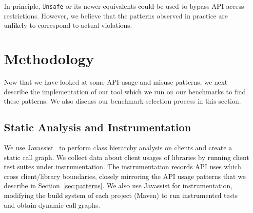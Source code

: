 In principle, \texttt{Unsafe} or its newer equivalents could be used to bypass API access restrictions. However, we believe that the patterns observed in practice are unlikely to correspond to actual violations.










\section{Methodology}
\label{sec:methodology}

Now that we have looked at some API usage and misuse patterns, we next describe the implementation of our tool which we run on our benchmarks to find these patterns.
We also discuss our benchmark selection process in this section.

\subsection{Static Analysis and Instrumentation}
\label{sec:analyses}

We use Javassist~\cite{chiba00:_load_struc_reflec_java} to perform class hierarchy analysis on clients
and create a static call graph. We collect data about client usages of libraries by running client
test suites under instrumentation. The instrumentation records API
uses which cross client/library boundaries, closely mirroring the API
usage patterns that we describe in
Section~\ref{sec:patterns}. We also use Javassist for instrumentation,
modifying the build system of each project (Maven) to run instrumented
tests and obtain dynamic call graphs. 
\\

